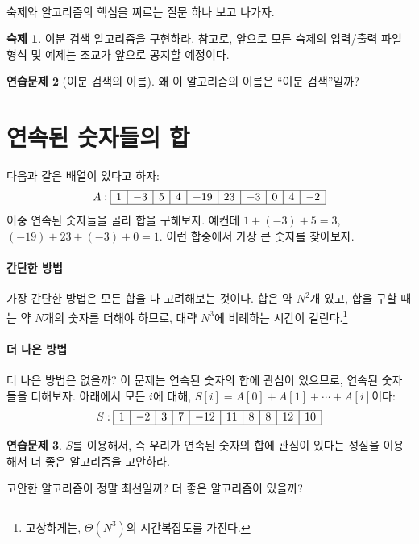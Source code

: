 \documentclass{oblivoir}
\theoremstyle{definition}
\newtheorem{exercise}{연습문제}
\newtheorem{homework}[exercise]{숙제}
\begin{document}
\paragraph{} 숙제와 알고리즘의 핵심을 찌르는 질문 하나 보고 나가자.

\begin{homework}
  이분 검색 알고리즘을 구현하라.  참고로, 앞으로 모든 숙제의 입력/출력
  파일 형식 및 예제는 조교가 앞으로 공지할 예정이다.
\end{homework}

\begin{exercise}[이분 검색의 이름]
  왜 이 알고리즘의 이름은 ``이분 검색''일까?
\end{exercise}

\section{연속된 숫자들의 합}

다음과 같은 배열이 있다고 하자:
\[
A: \begin{array}{|c|c|c|c|c|c|c|c|c|c|}
\hline
1 & -3 & 5 & 4 & -19 & 23 & -3 & 0 & 4 & -2 \\
\hline
\end{array}
\]
이중 연속된 숫자들을 골라 합을 구해보자.  예컨데 $1+(-3)+5=3$,
$(-19)+23+(-3)+0=1$.  이런 합중에서 가장 큰 숫자를 찾아보자.

\paragraph{간단한 방법}
가장 간단한 방법은 모든 합을 다 고려해보는 것이다. 합은 약 $N^2$개
있고, 합을 구할 때는 약 $N$개의 숫자를 더해야 하므로, 대략 $N^3$에
비례하는 시간이 걸린다.\footnote{고상하게는, $\Theta(N^3)$의
  시간복잡도를 가진다.}

\paragraph{더 나은 방법}
더 나은 방법은 없을까?  이 문제는 연속된 숫자의 합에 관심이 있으므로,
연속된 숫자들을 더해보자.  아래에서 모든 $i$에 대해,
$S[i] = A[0] + A[1] + \cdots + A[i]$이다:
\[
S: \begin{array}{|c|c|c|c|c|c|c|c|c|c|}
\hline
1 & -2 & 3 & 7 & -12 & 11 &  8 & 8 & 12 & 10 \\
\hline
\end{array}
\]
\begin{exercise}
  $S$를 이용해서, 즉 우리가 연속된 숫자의 합에 관심이 있다는 성질을
  이용해서 더 좋은 알고리즘을 고안하라.

  고안한 알고리즘이 정말 최선일까?  더 좋은 알고리즘이 있을까?
\end{exercise}
\end{document}

